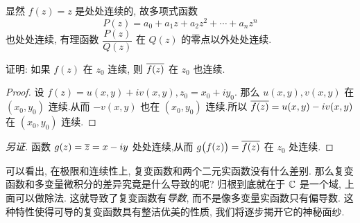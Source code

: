 显然 $f(z)=z$ 是处处连续的, 故多项式函数
\[P(z)=a_0+a_1z+a_2z^2+\cdots+a_nz^n\]
也处处连续, 有理函数 $\dfrac{P(z)}{Q(z)}$ 在 $Q(z)$ 的零点以外处处连续.

\begin{example}
  证明: 如果 $f(z)$ 在 $z_0$ 连续, 则 $\overline{f(z)}$ 在 $z_0$ 也连续.
\end{example}

\begin{proof}
  设 $f(z)=u(x,y)+iv(x,y),z_0=x_0+iy_0$.
  那么 $u(x,y),v(x,y)$ 在 $(x_0,y_0)$ 连续.从而 $-v(x,y)$ 也在 $(x_0,y_0)$ 连续.所以 $\overline{f(z)}=u(x,y)-iv(x,y)$ 在 $(x_0,y_0)$ 连续.
\end{proof}
\begin{proof}[另证]
  函数 $g(z)=\overline z=x-iy$ 处处连续,从而 $g\bigl(f(z)\bigr)=\overline{f(z)}$ 在 $z_0$ 处连续.
\end{proof}

可以看出, 在极限和连续性上, 复变函数和两个二元实函数没有什么差别.
那么复变函数和多变量微积分的差异究竟是什么导致的呢?
归根到底就在于 ${\mathbb{C}}$ 是一个域, 上面可以做除法.
这就导致了复变函数有\emph{导数}, 而不是像多变量实函数只有偏导数.
这种特性使得可导的复变函数具有整洁优美的性质, 我们将逐步揭开它的神秘面纱.


